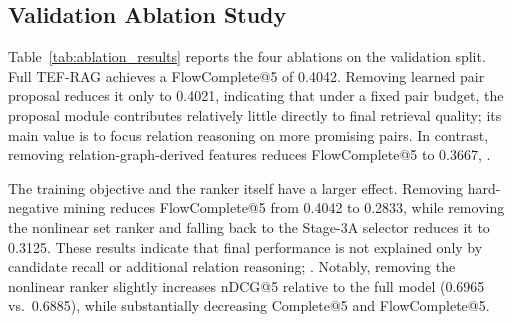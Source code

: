 \subsection{Validation Ablation Study}
\label{sec:ablation_results}

Table~\ref{tab:ablation_results} reports the four ablations on the validation split. Full TEF-RAG achieves a FlowComplete@5 of 0.4042. Removing learned pair proposal reduces it only to 0.4021, indicating that under a fixed pair budget, the proposal module contributes relatively little directly to final retrieval quality; its main value is to focus relation reasoning on more promising pairs. %
In contrast, removing relation-graph-derived features reduces FlowComplete@5 to 0.3667, .

The training objective and the ranker itself have a larger effect. Removing hard-negative mining reduces FlowComplete@5 from 0.4042 to 0.2833, while removing the nonlinear set ranker and falling back to the Stage-3A selector reduces it to 0.3125. %
These results indicate that final performance is not explained only by candidate recall or additional relation reasoning; . Notably, removing the nonlinear ranker slightly increases nDCG@5 relative to the full model (0.6965 vs.\ 0.6885), while substantially decreasing Complete@5 and FlowComplete@5. %

\begin{table}[t]
\caption{TEF-RAG ablation results on the validation split.}
\label{tab:ablation_results}
\centering
\small
\setlength{\tabcolsep}{3pt}
\end{table}

